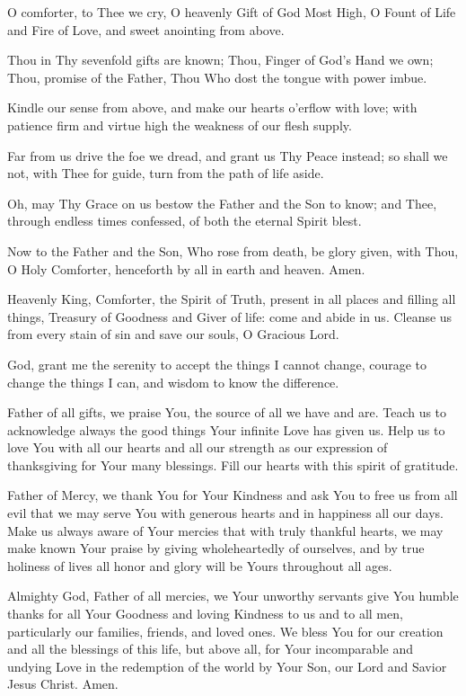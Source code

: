 O comforter, to Thee we cry,
O heavenly Gift of God Most High,
O Fount of Life and Fire of Love,
and sweet anointing from above.

Thou in Thy sevenfold gifts are known;
Thou, Finger of God's Hand we own;
Thou, promise of the Father, Thou
Who dost the tongue with power imbue.

Kindle our sense from above,
and make our hearts o'erflow with love;
with patience firm and virtue high
the weakness of our flesh supply.

Far from us drive the foe we dread,
and grant us Thy Peace instead;
so shall we not, with Thee for guide,
turn from the path of life aside.

Oh, may Thy Grace on us bestow
the Father and the Son to know;
and Thee, through endless times confessed,
of both the eternal Spirit blest.

Now to the Father and the Son,
Who rose from death, be glory given,
with Thou, O Holy Comforter,
henceforth by all in earth and heaven.
Amen.

Heavenly King, Comforter, the Spirit of Truth, present in all places and filling all things, Treasury of Goodness and Giver of life: come and abide in us.
Cleanse us from every stain of sin and save our souls, O Gracious Lord.

God, grant me the serenity to accept the things I cannot change,
courage to change the things I can,
and wisdom to know the difference.

Father of all gifts, we praise You, the source of all we have and are.
Teach us to acknowledge always the good things Your infinite Love has given us.
Help us to love You with all our hearts and all our strength as our expression of thanksgiving for Your many blessings.
Fill our hearts with this spirit of gratitude.

Father of Mercy, we thank You for Your Kindness and ask You to free us from all evil that we may serve You with generous hearts and in happiness all our days.
Make us always aware of Your mercies that with truly thankful hearts, we may make known Your praise by giving wholeheartedly of ourselves, and by true holiness of lives all honor and glory will be Yours throughout all ages.

Almighty God, Father of all mercies, we Your unworthy servants give You humble thanks for all Your Goodness and loving Kindness to us and to all men, particularly our families, friends, and loved ones.
We bless You for our creation and all the blessings of this life, but above all, for Your incomparable and undying Love in the redemption of the world by Your Son, our Lord and Savior Jesus Christ.
Amen.

